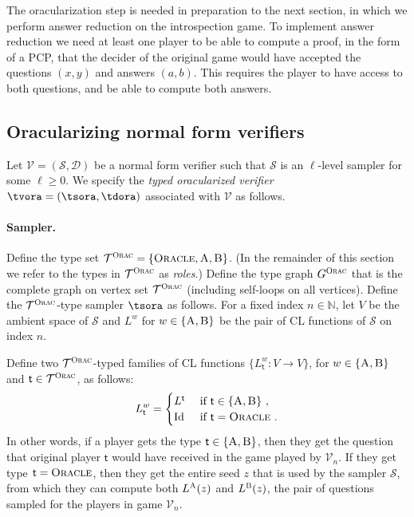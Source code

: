 \documentclass[11pt]{article}
\theoremstyle{definition}
\newcommand{\N}{\ensuremath{\mathbb{N}}}
\newcommand{\sampler}{\mathcal{S}}
\newcommand{\decider}{\mathcal{D}}
\newcommand{\verifier}{\mathcal{V}}
\newcommand{\type}{\mathcal{T}}
\newcommand{\gamestyle}[1]{\ensuremath{\textsc{#1}}\xspace}
\newcommand{\ora}{\gamestyle{Orac}}
\newcommand{\labelstyle}[1]{\ensuremath{\textsc{#1}}\xspace}
\newcommand{\tvarstyle}[1]{\mathsf{#1}}
\newcommand{\tvar}{\ensuremath{\tvarstyle{t}}}
\newcommand{\alice}{\labelstyle{A}}
\newcommand{\bob}{\labelstyle{B}}
\newcommand{\oracle}{\labelstyle{Oracle}}
\newcommand{\ab}{\{\alice, \bob\}}
\begin{document}
The oracularization step is needed in preparation to the next section, in which
we perform answer reduction on the introspection game.
To implement answer reduction we need at least one player to be able to compute
a proof, in the form of a PCP, that the decider of the original game would have
accepted the questions $(x,y)$ and answers $(a,b)$.
This requires the player to have access to both questions, and be able to
compute both answers.

\subsection{Oracularizing normal form verifiers}
\label{sec:orac-def}

Let $\verifier = (\sampler,\decider)$ be a normal form verifier such that
$\sampler$ is an $\ell$-level sampler for some $\ell \geq 0$.
We specify the \emph{typed oracularized verifier} $\tvora =
(\tsora,\tdora)$ associated with $\verifier$ as follows. 


\paragraph{Sampler.}
Define the type set $\type^\ora = \{\oracle,\alice,\bob\}$.
(In the remainder of this section we refer to the types in $\type^\ora$ as
\emph{roles}.)
Define the type graph $G^\ora$ that is the complete graph on vertex set
$\type^\ora$ (including self-loops on all vertices).
Define the $\type^\ora$-type sampler $\tsora$ as follows.
For a fixed index $n \in \N$, let $V$ be the ambient space of $\sampler$ and
$L^w$ for $w \in \ab $ be the pair of CL functions of $\sampler$ on index $n$.

Define two $\type^\ora$-typed families of CL functions $\{ L^{w}_\tvar: V \to V
\}$, for $w \in \{\alice,\bob\}$ and $\tvar \in \type^\ora$, as follows:
\begin{equation*}
	L^{w}_\tvar =
  \begin{cases}
		L^\tvar & \text { if $\tvar \in \{\alice,\bob\}$ }, \\
		\mathrm{Id} & \text { if $\tvar = \oracle$ }.
	\end{cases}
\end{equation*}
In other words, if a player gets the type $\tvar \in \{\alice,\bob\}$, then they
get the question that original player $\tvar$ would have received in the game
played by $\verifier_n$.
If they get type $\tvar = \oracle$, then they get the entire seed $z$ that is
used by the sampler $\sampler$, from which they can compute both $L^\alice(z)$
and $L^\bob(z)$, the pair of questions sampled for the players in game
$\verifier_n$.
\end{document}
